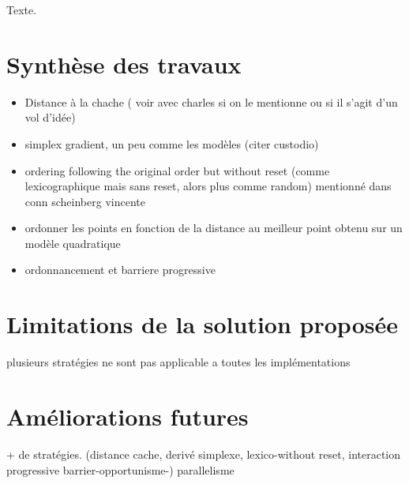 \label{sec:Conclusion}
Texte.

\section{Synthèse des travaux}
\begin{itemize}
	\item Distance à la chache ( voir avec charles si on le mentionne ou si il s'agit d'un vol d'idée)
	\item simplex gradient, un peu comme les modèles (citer custodio)
	\item ordering following the original order but without reset (comme lexicographique mais sans reset, alors plus comme random) mentionné dans conn scheinberg vincente
	\item ordonner les points en fonction de la distance au meilleur point obtenu sur un modèle quadratique
	\item ordonnancement et barriere progressive
\end{itemize}
\section{Limitations de la solution proposée}\label{sec:Limitations}
plusieurs stratégies ne sont pas applicable a toutes les implémentations
\section{Améliorations futures}
+ de stratégies. (distance cache, derivé simplexe, lexico-without reset, interaction progressive barrier-opportunisme-)
parallelisme

